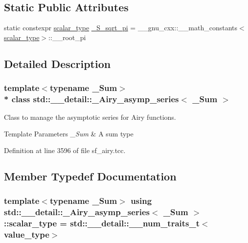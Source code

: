 \subsection*{Static Public Attributes}
\begin{DoxyCompactItemize}
\item 
static constexpr \hyperlink{classstd_1_1____detail_1_1__Airy__asymp__series_a17ec74b13ebc38d5531bf27cd31684fb}{scalar\+\_\+type} \hyperlink{classstd_1_1____detail_1_1__Airy__asymp__series_a0a4d017f86429e22f5939e689e7b93ca}{\+\_\+\+S\+\_\+sqrt\+\_\+pi} = \+\_\+\+\_\+gnu\+\_\+cxx\+::\+\_\+\+\_\+math\+\_\+constants$<$\hyperlink{classstd_1_1____detail_1_1__Airy__asymp__series_a17ec74b13ebc38d5531bf27cd31684fb}{scalar\+\_\+type}$>$\+::\+\_\+\+\_\+root\+\_\+pi
\end{DoxyCompactItemize}


\subsection{Detailed Description}
\subsubsection*{template$<$typename \+\_\+\+Sum$>$\\*
class std\+::\+\_\+\+\_\+detail\+::\+\_\+\+Airy\+\_\+asymp\+\_\+series$<$ \+\_\+\+Sum $>$}

Class to manage the asymptotic series for Airy functions.


\begin{DoxyTemplParams}{Template Parameters}
{\em \+\_\+\+Sum} & A sum type \\
\hline
\end{DoxyTemplParams}


Definition at line 3596 of file sf\+\_\+airy.\+tcc.



\subsection{Member Typedef Documentation}
\subsubsection[{\texorpdfstring{scalar\+\_\+type}{scalar_type}}]{\setlength{\rightskip}{0pt plus 5cm}template$<$typename \+\_\+\+Sum$>$ using {\bf std\+::\+\_\+\+\_\+detail\+::\+\_\+\+Airy\+\_\+asymp\+\_\+series}$<$ \+\_\+\+Sum $>$\+::{\bf scalar\+\_\+type} =  std\+::\+\_\+\+\_\+detail\+::\+\_\+\+\_\+num\+\_\+traits\+\_\+t$<${\bf value\+\_\+type}$>$}\hypertarget{classstd_1_1____detail_1_1__Airy__asymp__series_a17ec74b13ebc38d5531bf27cd31684fb}{}\label{classstd_1_1____detail_1_1__Airy__asymp__series_a17ec74b13ebc38d5531bf27cd31684fb}


